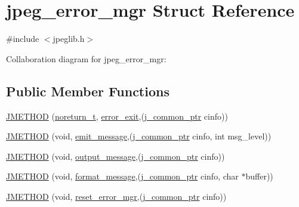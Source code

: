 \hypertarget{structjpeg__error__mgr}{}\section{jpeg\+\_\+error\+\_\+mgr Struct Reference}
\label{structjpeg__error__mgr}


{\ttfamily \#include $<$jpeglib.\+h$>$}



Collaboration diagram for jpeg\+\_\+error\+\_\+mgr\+:
\subsection*{Public Member Functions}
\begin{DoxyCompactItemize}
\item 
\mbox{\hyperlink{structjpeg__error__mgr_a72c40bceda2e6cb78046165e6892ac3a}{J\+M\+E\+T\+H\+OD}} (\mbox{\hyperlink{jmorecfg_8h_abaffdc8256e7ef5c7565ca45e6d3e628}{noreturn\+\_\+t}}, \mbox{\hyperlink{jerror_8c_ac6efeb7cb80ae59d9ccdf1a16e20b2ff}{error\+\_\+exit}},(\mbox{\hyperlink{jpeglib_8h_a1a177ab705cefea8f30ec31a48e62650}{j\+\_\+common\+\_\+ptr}} cinfo))
\item 
\mbox{\hyperlink{structjpeg__error__mgr_a73c0a027b6e6cb8ff2b7b0fc42f756f9}{J\+M\+E\+T\+H\+OD}} (void, \mbox{\hyperlink{jerror_8c_a0f5ad91b180dbac82fb322091d5b390a}{emit\+\_\+message}},(\mbox{\hyperlink{jpeglib_8h_a1a177ab705cefea8f30ec31a48e62650}{j\+\_\+common\+\_\+ptr}} cinfo, int msg\+\_\+level))
\item 
\mbox{\hyperlink{structjpeg__error__mgr_ac2989f8ef34acdd78ce26a9110a1c094}{J\+M\+E\+T\+H\+OD}} (void, \mbox{\hyperlink{jerror_8c_ac726e73416c0b5394af1a4275dd61346}{output\+\_\+message}},(\mbox{\hyperlink{jpeglib_8h_a1a177ab705cefea8f30ec31a48e62650}{j\+\_\+common\+\_\+ptr}} cinfo))
\item 
\mbox{\hyperlink{structjpeg__error__mgr_a5f1dfb51c337c36ae1bc5fae7f84528f}{J\+M\+E\+T\+H\+OD}} (void, \mbox{\hyperlink{jerror_8c_a67e2834aaaecd3d95b274bf47f96cd2a}{format\+\_\+message}},(\mbox{\hyperlink{jpeglib_8h_a1a177ab705cefea8f30ec31a48e62650}{j\+\_\+common\+\_\+ptr}} cinfo, char $\ast$buffer))
\item 
\mbox{\hyperlink{structjpeg__error__mgr_ac676478083167b3731995d7901bd4b6c}{J\+M\+E\+T\+H\+OD}} (void, \mbox{\hyperlink{jerror_8c_acd2c85048aefc02e56fc620974c5564b}{reset\+\_\+error\+\_\+mgr}},(\mbox{\hyperlink{jpeglib_8h_a1a177ab705cefea8f30ec31a48e62650}{j\+\_\+common\+\_\+ptr}} cinfo))
\end{DoxyCompactItemize}
